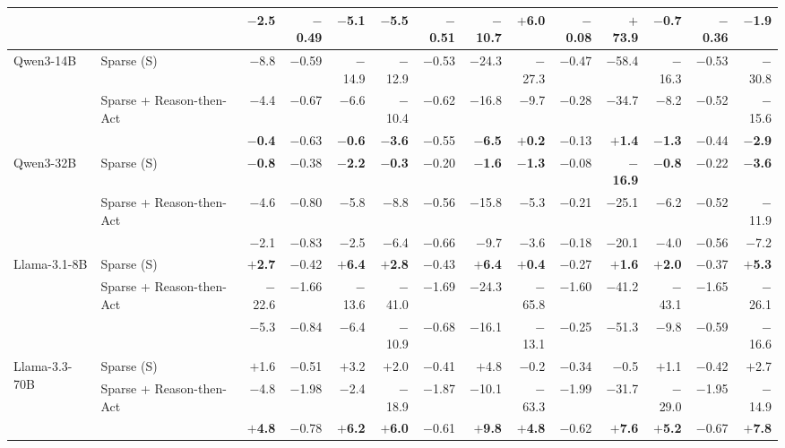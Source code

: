 \begin{table}[H]
{\begin{tabular}{ll rrr rrr rrr rrr}
  & \method{}        & \textbf{$-$2.5}  & $-$0.49 & \textbf{$-$5.1}  & \textbf{$-$5.5}  & $-$0.51 & \textbf{$-$10.7} & \textbf{$+$6.0} & $-$0.08 & \textbf{$+$73.9} & \textbf{$-$0.7} & $-$0.36 & \textbf{$-$1.9} \\
\midrule
\multirow{3}{*}{Qwen3-14B}
  & Sparse (S)       & $-$8.8  & $-$0.59 & $-$14.9 & $-$12.9 & $-$0.53 & $-$24.3 & $-$27.3 & $-$0.47 & $-$58.4 & $-$16.3 & $-$0.53 & $-$30.8 \\
  & Sparse + Reason-then-Act   & $-$4.4  & $-$0.67 & $-$6.6  & $-$10.4 & $-$0.62 & $-$16.8 & $-$9.7  & $-$0.28 & $-$34.7 & $-$8.2 & $-$0.52 & $-$15.6 \\
  & \method{}        & \textbf{$-$0.4}  & $-$0.63 & \textbf{$-$0.6}  & \textbf{$-$3.6}  & $-$0.55 & \textbf{$-$6.5}  & \textbf{$+$0.2} & $-$0.13 & \textbf{$+$1.4} & \textbf{$-$1.3} & $-$0.44 & \textbf{$-$2.9} \\
\midrule
\multirow{3}{*}{Qwen3-32B}
  & Sparse (S)       & \textbf{$-$0.8}  & $-$0.38 & \textbf{$-$2.2}  & \textbf{$-$0.3}  & $-$0.20 & \textbf{$-$1.6}  & \textbf{$-$1.3}  & $-$0.08 & \textbf{$-$16.9} & \textbf{$-$0.8} & $-$0.22 & \textbf{$-$3.6} \\
  & Sparse + Reason-then-Act   & $-$4.6  & $-$0.80 & $-$5.8  & $-$8.8  & $-$0.56 & $-$15.8 & $-$5.3  & $-$0.21 & $-$25.1 & $-$6.2 & $-$0.52 & $-$11.9 \\
  & \method{}        & $-$2.1  & $-$0.83 & $-$2.5  & $-$6.4  & $-$0.66 & $-$9.7  & $-$3.6  & $-$0.18 & $-$20.1 & $-$4.0 & $-$0.56 & $-$7.2 \\
\midrule
\multirow{3}{*}{Llama-3.1-8B}
  & Sparse (S)       & \textbf{$+$2.7}  & $-$0.42 & \textbf{$+$6.4}  & \textbf{$+$2.8}  & $-$0.43 & \textbf{$+$6.4}  & \textbf{$+$0.4}  & $-$0.27 & \textbf{$+$1.6} & \textbf{$+$2.0} & $-$0.37 & \textbf{$+$5.3} \\
  & Sparse + Reason-then-Act   & $-$22.6 & $-$1.66 & $-$13.6 & $-$41.0 & $-$1.69 & $-$24.3 & $-$65.8 & $-$1.60 & $-$41.2 & $-$43.1 & $-$1.65 & $-$26.1 \\
  & \method{}        & $-$5.3  & $-$0.84 & $-$6.4  & $-$10.9 & $-$0.68 & $-$16.1 & $-$13.1 & $-$0.25 & $-$51.3 & $-$9.8 & $-$0.59 & $-$16.6 \\
\midrule
\multirow{3}{*}{Llama-3.3-70B}
  & Sparse (S)       & $+$1.6  & $-$0.51 & $+$3.2  & $+$2.0  & $-$0.41 & $+$4.8  & $-$0.2  & $-$0.34 & $-$0.5 & $+$1.1 & $-$0.42 & $+$2.7 \\
  & Sparse + Reason-then-Act   & $-$4.8  & $-$1.98 & $-$2.4  & $-$18.9 & $-$1.87 & $-$10.1 & $-$63.3 & $-$1.99 & $-$31.7 & $-$29.0 & $-$1.95 & $-$14.9 \\
  & \method{}        & \textbf{$+$4.8} & $-$0.78 & \textbf{$+$6.2} & \textbf{$+$6.0} & $-$0.61 & \textbf{$+$9.8} & \textbf{$+$4.8} & $-$0.62 & \textbf{$+$7.6} & \textbf{$+$5.2} & $-$0.67 & \textbf{$+$7.8} \\
\bottomrule
\end{tabular}%
}
\end{table}

